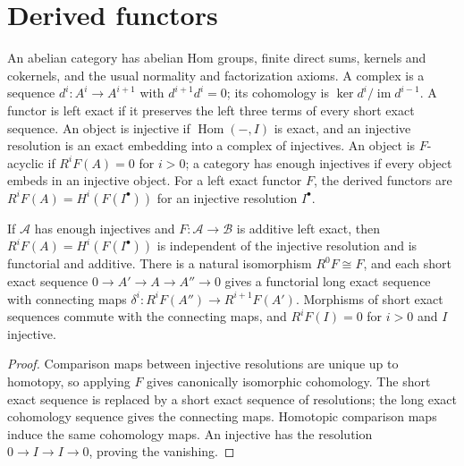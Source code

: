 \section{Derived functors}
\label{ha-ch3-sec1}

\begin{definition}
\label{ha-ch3-def-abelian}
An abelian category has abelian Hom groups, finite direct sums, kernels and
cokernels, and the usual normality and factorization axioms.  A complex is a
sequence $d^{i}:A^{i}\to A^{i+1}$ with $d^{i+1}d^i=0$; its cohomology is
$\ker d^i/\operatorname{im}d^{i-1}$.  A functor is left exact if it preserves
the left three terms of every short exact sequence.  An object is injective if
$\operatorname{Hom}(-,I)$ is exact, and an injective resolution is an exact
embedding into a complex of injectives.  An object is $F$-acyclic if
$R^iF(A)=0$ for $i>0$; a category has enough injectives if every object embeds
in an injective object.  For a left exact functor $F$, the derived functors are
$R^iF(A)=H^i(F(I^\bullet))$ for an injective resolution $I^\bullet$.
\end{definition}

\begin{theorem}
\label{ha-ch3-thm-derived}
If $\mathcal A$ has enough injectives and $F:\mathcal A\to\mathcal B$ is
additive left exact, then $R^iF(A)=H^i(F(I^\bullet))$ is independent of the
injective resolution and is functorial and additive.  There is a natural
isomorphism $R^0F\cong F$, and each short exact sequence
$0\to A'\to A\to A''\to0$ gives a functorial long exact sequence with
connecting maps $\delta^i:R^iF(A'')\to R^{i+1}F(A')$.  Morphisms of short
exact sequences commute with the connecting maps, and $R^iF(I)=0$ for
$i>0$ and $I$ injective.

\end{theorem}
\begin{proof}

Comparison maps between injective resolutions are unique up to homotopy, so
applying $F$ gives canonically isomorphic cohomology.  The short exact
sequence is replaced by a short exact sequence of resolutions; the long
exact cohomology sequence gives the connecting maps.  Homotopic comparison
maps induce the same cohomology maps.  An injective has the resolution
$0\to I\to I\to0$, proving the vanishing.

\end{proof}

